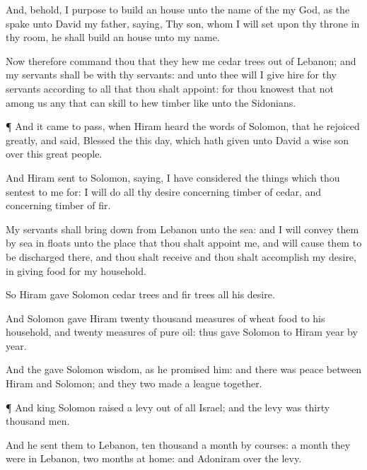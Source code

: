 {And, behold, I
purpose to
build an
house unto the
name of the
{} my
God, as the
{}
spake unto
David my
father,
saying, Thy
son, whom I will
set upon thy
throne in thy room, he shall
build an
house unto my
name.

Now therefore
command thou that they
hew me cedar
trees out of
Lebanon; and my
servants shall be with thy
servants: and unto thee will I
give
hire for thy
servants according to all that thou shalt
appoint: for thou
knowest that
{} not among us
any that can
skill to
hew
timber like unto the
Sidonians.


\par }{\PP {}¶ And it came to pass, when
Hiram
heard the
words of
Solomon, that he
rejoiced
greatly, and
said,
Blessed
{} the
{} this
day, which hath
given unto
David a
wise
son over this
great
people.

And
Hiram
sent to
Solomon,
saying, I have
considered the things which thou
sentest to me for:
{} I will
do all thy
desire concerning
timber of
cedar, and concerning
timber of
fir.

My
servants shall bring
{}
down from
Lebanon unto the
sea: and I will
convey them by
sea in
floats unto the
place that thou shalt
appoint me, and will cause them to be
discharged there, and thou shalt
receive
{} and thou shalt
accomplish my
desire, in
giving
food for my
household.


\par }{\PP {}So
Hiram
gave
Solomon
cedar
trees and
fir
trees
{} all his
desire.

And
Solomon
gave
Hiram
twenty
thousand
measures of
wheat
{}
food to his
household, and
twenty
measures of
pure
oil: thus
gave
Solomon to
Hiram
year by
year.

And the
{}
gave
Solomon
wisdom, as he
promised him: and there was
peace between
Hiram and
Solomon; and they
two
made a
league
together.


\par }{\PP {}¶ And
king
Solomon
raised a
levy out of all
Israel; and the
levy was
thirty
thousand
men.

And he
sent them to
Lebanon,
ten
thousand a
month by
courses: a
month they were in
Lebanon,
{}
two
months at
home: and
Adoniram
{} over the
levy.

}
